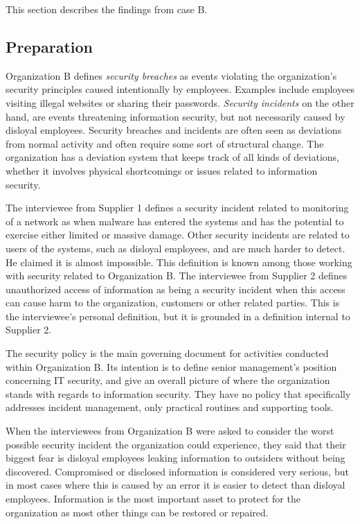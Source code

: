 \documentclass[b5paper, twoside, openright, 11pt]{report}
\begin{document}

This section describes the findings from case B.

\subsection{Preparation}
Organization B defines \textit{security breaches} as events violating the organization's security principles caused intentionally by employees. Examples include employees visiting illegal websites or sharing their passwords. \textit{Security incidents} on the other hand, are events threatening information security, but not necessarily caused by disloyal employees. Security breaches and incidents are often seen as deviations from normal activity and often require some sort of structural change. The organization has a deviation system that keeps track of all kinds of deviations, whether it involves physical shortcomings or issues related to information security.

The interviewee from Supplier 1 defines a security incident related to monitoring of a network as when malware has entered the systems and has the potential to exercise either limited or massive damage. Other security incidents are related to users of the systems, such as disloyal employees, and are much harder to detect. He claimed it is almost impossible. This definition is known among those working with security related to Organization B. The interviewee from Supplier 2 defines unauthorized access of information as being a security incident when this access can cause harm to the organization, customers or other related parties. This is the interviewee's personal definition, but it is grounded in a definition internal to Supplier 2.

The security policy is the main governing document for activities conducted within Organization B. Its intention is to define senior management's position concerning IT security, and give an overall picture of where the organization stands with regards to information security. They have no policy that specifically addresses incident management, only practical routines and supporting tools.

When the interviewees from Organization B were asked to consider the worst possible security incident the organization could experience, they said that their biggest fear is disloyal employees leaking information to outsiders without being discovered. Compromised or disclosed information is considered very serious, but in most cases where this is caused by an error it is easier to detect than disloyal employees. Information is the most important asset to protect for the organization as most other things can be restored or repaired.
\end{document}
